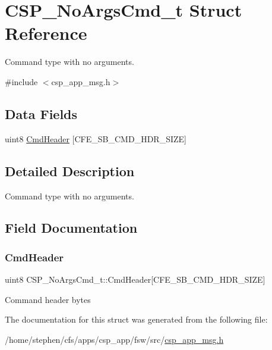 \hypertarget{structCSP__NoArgsCmd__t}{}\section{C\+S\+P\+\_\+\+No\+Args\+Cmd\+\_\+t Struct Reference}
\label{structCSP__NoArgsCmd__t}


Command type with no arguments.  




{\ttfamily \#include $<$csp\+\_\+app\+\_\+msg.\+h$>$}

\subsection*{Data Fields}
\begin{DoxyCompactItemize}
\item 
uint8 \hyperlink{structCSP__NoArgsCmd__t_afbdab7f95f78702ed095799c8e4a2c2e}{Cmd\+Header} \mbox{[}C\+F\+E\+\_\+\+S\+B\+\_\+\+C\+M\+D\+\_\+\+H\+D\+R\+\_\+\+S\+I\+ZE\mbox{]}
\end{DoxyCompactItemize}


\subsection{Detailed Description}
Command type with no arguments. 

\subsection{Field Documentation}
\mbox{\label{structCSP__NoArgsCmd__t_afbdab7f95f78702ed095799c8e4a2c2e}} 
\subsubsection{\texorpdfstring{Cmd\+Header}{CmdHeader}}
{\footnotesize\ttfamily uint8 C\+S\+P\+\_\+\+No\+Args\+Cmd\+\_\+t\+::\+Cmd\+Header\mbox{[}C\+F\+E\+\_\+\+S\+B\+\_\+\+C\+M\+D\+\_\+\+H\+D\+R\+\_\+\+S\+I\+ZE\mbox{]}}

Command header bytes 

The documentation for this struct was generated from the following file\+:\begin{DoxyCompactItemize}
\item 
/home/stephen/cfs/apps/csp\+\_\+app/fsw/src/\hyperlink{csp__app__msg_8h}{csp\+\_\+app\+\_\+msg.\+h}\end{DoxyCompactItemize}
